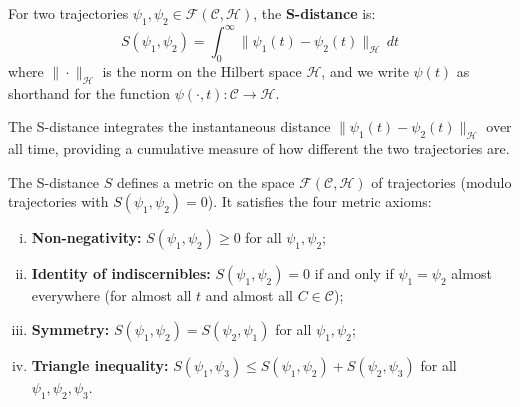 \begin{definition}[S-Distance]
\label{def:s_distance_formal}
For two trajectories $\psi_1, \psi_2 \in \mathcal{F}(\mathcal{C}, \mathcal{H})$, the \textbf{S-distance} is:
\begin{equation}
S(\psi_1, \psi_2) = \int_0^{\infty} \|\psi_1(t) - \psi_2(t)\|_{\mathcal{H}} \, dt
\label{eq:s_distance}
\end{equation}
where $\|\cdot\|_{\mathcal{H}}$ is the norm on the Hilbert space $\mathcal{H}$, and we write $\psi(t)$ as shorthand for the function $\psi(\cdot, t): \mathcal{C} \to \mathcal{H}$.

The S-distance integrates the instantaneous distance $\|\psi_1(t) - \psi_2(t)\|_{\mathcal{H}}$ over all time, providing a cumulative measure of how different the two trajectories are.
\end{definition}

\begin{theorem}
\label{thm:s_metric_formal}
The S-distance $S$ defines a metric on the space $\mathcal{F}(\mathcal{C}, \mathcal{H})$ of trajectories (modulo trajectories with $S(\psi_1, \psi_2) = 0$). It satisfies the four metric axioms:
\begin{enumerate}[(i)]
    \item \textbf{Non-negativity:} $S(\psi_1, \psi_2) \geq 0$ for all $\psi_1, \psi_2$;
    
    \item \textbf{Identity of indiscernibles:} $S(\psi_1, \psi_2) = 0$ if and only if $\psi_1 = \psi_2$ almost everywhere (for almost all $t$ and almost all $C \in \mathcal{C}$);
    
    \item \textbf{Symmetry:} $S(\psi_1, \psi_2) = S(\psi_2, \psi_1)$ for all $\psi_1, \psi_2$;
    
    \item \textbf{Triangle inequality:} $S(\psi_1, \psi_3) \leq S(\psi_1, \psi_2) + S(\psi_2, \psi_3)$ for all $\psi_1, \psi_2, \psi_3$.
\end{enumerate}
\end{theorem}

